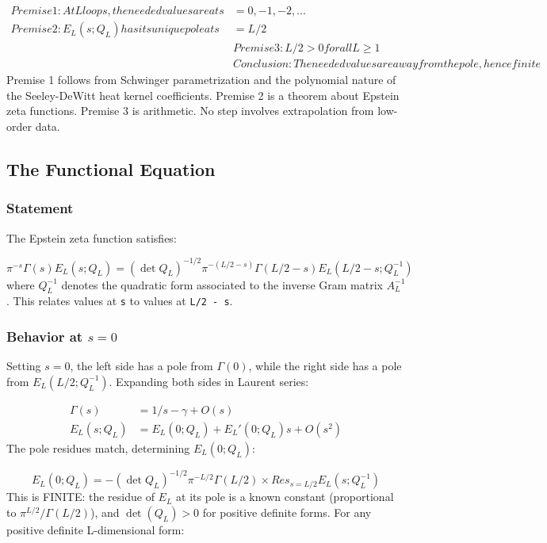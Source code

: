 \documentclass[aps,prd,preprint,superscriptaddress,longbibliography,floatfix]{revtex4-2}
\theoremstyle{remark}
\begin{document}
\begin{align}
    Premise 1: At L loops, the needed values are at s &= 0, -1, -2, ... \\
    Premise 2: E_L(s; Q_L) has its unique pole at s &= L/2 \\
    & Premise 3: L/2 > 0 for all L \geq 1 \\
    & Conclusion: The needed values are away from the pole, hence finite
\end{align}
Premise 1 follows from Schwinger parametrization and the polynomial nature of the Seeley-DeWitt heat kernel coefficients. Premise 2 is a theorem about Epstein zeta functions. Premise 3 is arithmetic. No step involves extrapolation from low-order data.



\subsection{The Functional Equation}


\subsubsection{Statement}

The Epstein zeta function satisfies:


\begin{equation}
    \pi^{-s} \Gamma(s) E_L(s; Q_L) = (\det Q_L)^{-1/2} \pi^{-(L/2-s)} \Gamma(L/2-s) E_L(L/2-s; Q_L^{-1})
\end{equation}
where $Q_L^{-1}$ denotes the quadratic form associated to the inverse Gram matrix $A_L^{-1}$. This relates values at \texttt{s} to values at \texttt{L/2 - s}.


\subsubsection{Behavior at $s = 0$}

Setting $s = 0$, the left side has a pole from $\Gamma(0)$, while the right side has a pole from $E_L(L/2; Q_L^{-1})$. Expanding both sides in Laurent series:


\begin{align}
    \Gamma(s) &= 1/s - \gamma + O(s) \\
    E_L(s; Q_L) &= E_L(0; Q_L) + E_L'(0; Q_L) s + O(s^{2})
\end{align}
The pole residues match, determining $E_L(0; Q_L)$:


\begin{equation}
    E_L(0; Q_L) = -(\det Q_L)^{-1/2} \pi^{-L/2} \Gamma(L/2) \times Res_{s=L/2} E_L(s; Q_L^{-1})
\end{equation}
This is FINITE: the residue of $E_L$ at its pole is a known constant (proportional to $\pi^{L/2} / \Gamma(L/2)$), and $\det(Q_L) > 0$ for positive definite forms. For any positive definite L-dimensional form:
\end{document}
